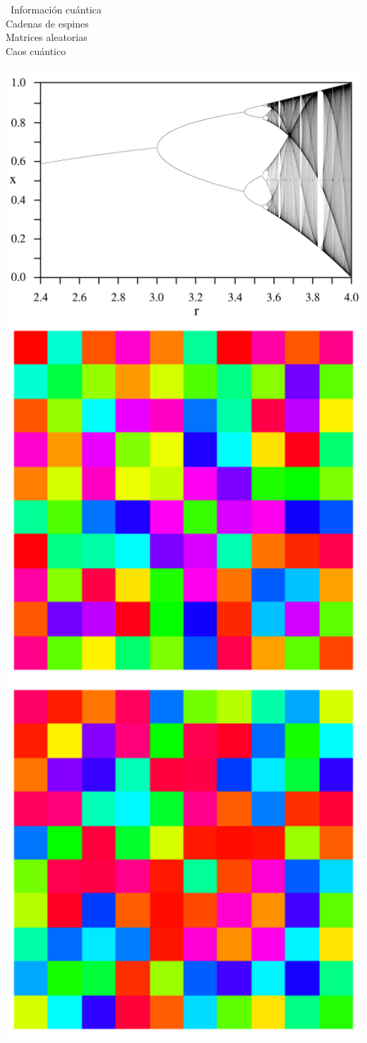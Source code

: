 \documentclass[pdftex,12pt, letterpaper]{report}
\begin{document}
\begin{titlepage}
\begin{center}
\begin{minipage}[c]{\adios}
\end{minipage}\hfill
\begin{minipage}[l]{\hola}
\LARGE
\begin{center}
\
Información cuántica \\[\spaceitems]
Cadenas de espines \\[\spaceitems]
Matrices aleatorias \\[\spaceitems]
Caos cuántico 
\end{center}
\end{minipage}
\begin{minipage}[c]{\adios}
\includegraphics[width=\textwidth]{LogisticMap_BifurcationDiagram2.png}
\includegraphics[width=.48\textwidth]{RM1}\hfill\includegraphics[width=.48\textwidth]{RM2}

\end{minipage}
\end{center}
\end{titlepage}
\end{document}
